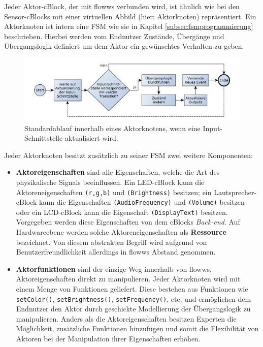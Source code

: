Jeder Aktor-cBlock, der mit flowws verbunden wird, ist ähnlich wie bei den Sensor-cBlocks mit einer virtuellen Abbild (hier: Aktorknoten) repräsentiert. Ein Aktorknoten ist intern eine \ac{FSM} wie sie in Kapitel \ref{subsec:fsmprogrammierung} beschrieben. Hierbei werden vom Endnutzer Zustände, Übergänge und Übergangslogik definiert um dem Aktor ein gewünschtes Verhalten zu geben.

 \begin{figure}[h]
  \centering
  \includegraphics[width=1\textwidth]{bilder/chapter4/chapter4_2/aktorblockablauf.pdf}
  \caption{Standardablauf innerhalb eines Aktorknotens, wenn eine Input-Schnittstelle aktualisiert wird.}
  \label{fig:seqfunktionsblock}
\end{figure}

Jeder Aktorknoten besitzt zusätzlich zu seiner \ac{FSM} zwei weitere Komponenten:
\begin{itemize}
    \item \textbf{Aktoreigenschaften} sind alle Eigenschaften, welche die Art des physikalische Signals beeinflussen. Ein LED-cBlock kann die Aktoreneigenschaften \texttt{(r,g,b)} und \texttt{(Brightness)} besitzen; ein Lautsprecher-cBlock kann die Eigenschaften \texttt{(AudioFrequency)} und \texttt{(Volume)} besitzen oder ein LCD-cBlock kann die Eigenschaft \texttt{(DisplayText)} besitzen. Vorgegeben werden diese Eigenschaften von dem cBlocks \textit{Back-end}. Auf Hardwareebene werden solche Aktoreneigenschaften als \textbf{Ressource} bezeichnet. Von diesem abstrakten Begriff wird aufgrund von Benutzerfreundlichkeit allerdings in flowws Abstand genommen.
    \item \textbf{Aktorfunktionen} sind der einzige Weg innerhalb von flowws, Aktoreigenschaften direkt zu manipulieren. Jeder Aktorknoten wird mit einem Menge von Funktionen geliefert. Diese bestehen aus Funktionen wie \texttt{setColor()}, \texttt{setBrightness()}, \texttt{setFrequency()}, etc; und ermöglichen dem Endnutzer den Aktor durch geschickte Modellierung der Übergangslogik zu manipulieren. Anders als die Aktoreigenschaften besitzen Experten die Möglichkeit, zusätzliche Funktionen hinzufügen und somit die Flexibilität von Aktoren bei der Manipulation ihrer Eigenschaften erhöhen.
\end{itemize}

